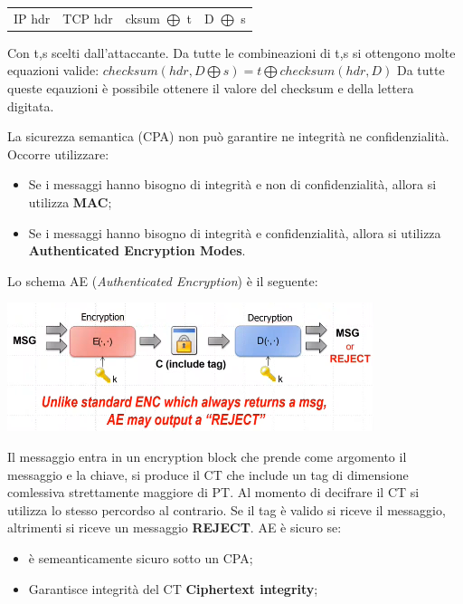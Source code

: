 \documentclass{book}
\theoremstyle{remark}
\begin{document}
\begin{itemize}
\begin{itemize}
		            \begin{center}
			            \begin{tabular}{|c|c|c|c|}
				            IP hdr & TCP hdr & cksum \(\bigoplus\) t & D \(\bigoplus\) s \\
			            \end{tabular}
		            \end{center}
		            Con t,s scelti dall'attaccante\@. Da tutte le combineazioni di t,s si ottengono molte equazioni valide:
		            \newline\(checksum (hdr,D\bigoplus s)=t\bigoplus checksum (hdr,D)\)\newline
		            Da tutte queste eqauzioni è possibile ottenere il valore del checksum e della lettera digitata\@.
	      \end{itemize}
\end{itemize}
La sicurezza semantica (CPA) non può garantire ne integrità ne confidenzialità\@. Occorre utilizzare:
\begin{itemize}
	\item Se i messaggi hanno bisogno di integrità e non di confidenzialità, allora si utilizza \textbf{MAC};\@
	\item Se i messaggi hanno bisogno di integrità e confidenzialità, allora si utilizza \textbf{Authenticated Encryption Modes}\@.
\end{itemize}
Lo schema AE (\emph{Authenticated Encryption}) è il seguente:
\begin{center}
	\includegraphics*[scale=0.8]{2021-11-21-21-02-14.png}
\end{center}
Il messaggio entra in un encryption block che prende come argomento il messaggio e la chiave, si produce il CT che include un tag
di dimensione comlessiva strettamente maggiore di PT\@. Al momento di decifrare il CT si utilizza lo stesso percordso al contrario\@.
Se il tag è valido si riceve il messaggio, altrimenti si riceve un messaggio \textbf{REJECT}\@.\newline
AE è sicuro se:
\begin{itemize}
	\item è semeanticamente sicuro sotto un CPA;\@
	\item Garantisce integrità del CT \textbf{Ciphertext integrity};\@
\end{itemize}
\end{document}
